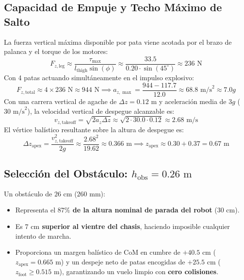 \documentclass[11pt,a4paper]{article}
\begin{document}
\subsection{Capacidad de Empuje y Techo Máximo de Salto}
La fuerza vertical máxima disponible por pata viene acotada por el brazo de palanca y el torque de los motores:
\begin{equation}
F_{z,\text{leg}} \approx \frac{\tau_{\max}}{l_{\text{thigh}} \sin(\phi)} \approx \frac{33.5}{0.20 \cdot \sin(45^\circ)} \approx 236\text{ N}
\end{equation}
Con 4 patas actuando simultáneamente en el impulso explosivo:
\begin{equation}
F_{z,\text{total}} \approx 4 \times 236\text{ N} \approx 944\text{ N} \implies a_{z,\max} = \frac{944 - 117.7}{12.0} \approx 68.8\text{ m/s}^2 \approx 7.0 g
\end{equation}
Con una carrera vertical de agache de $\Delta z = 0.12\text{ m}$ y aceleración media de $3g$ ($30\text{ m/s}^2$), la velocidad vertical de despegue alcanzable es:
\begin{equation}
v_{z,\text{takeoff}} = \sqrt{2 a_z \Delta z} \approx \sqrt{2 \cdot 30.0 \cdot 0.12} \approx 2.68\text{ m/s}
\end{equation}
El vértice balístico resultante sobre la altura de despegue es:
\begin{equation}
\Delta z_{\text{apex}} = \frac{v_{z,\text{takeoff}}^2}{2 g} \approx \frac{2.68^2}{19.62} \approx 0.366\text{ m} \implies z_{\text{apex}} \approx 0.30 + 0.37 = 0.67\text{ m}
\end{equation}

\subsection{Selección del Obstáculo: \texorpdfstring{$h_{\text{obs}} = 0.26\text{ m}$}{h = 0.26 m}}
Un obstáculo de $26\text{ cm}$ ($260\text{ mm}$):
\begin{itemize}
    \item Representa el \textbf{$87\%$ de la altura nominal de parada del robot} ($30\text{ cm}$).
    \item Es \textbf{$7\text{ cm}$ superior al vientre del chasis}, haciendo imposible cualquier intento de marcha.
    \item Proporciona un margen balístico de CoM en cumbre de $+40.5\text{ cm}$ ($z_{\text{apex}} = 0.665\text{ m}$) y un despeje neto de patas encogidas de $+25.5\text{ cm}$ ($z_{\text{foot}} \ge 0.515\text{ m}$), garantizando un vuelo limpio con \textbf{cero colisiones}.
\end{itemize}
\end{document}
